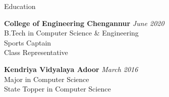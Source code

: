 \documentclass{resume} %
\begin{document}

\begin{rSection}{Education}

{\bf College of Engineering Chengannur} \hfill {\em June 2020} \\
B.Tech in Computer Science \& Engineering \\
Sports Captain \\
Class Representative

{\bf Kendriya Vidyalaya Adoor} \hfill {\em March 2016} \\
Major in Computer Science\\
State Topper in Computer Science\\
\end{rSection}

\end{document}
